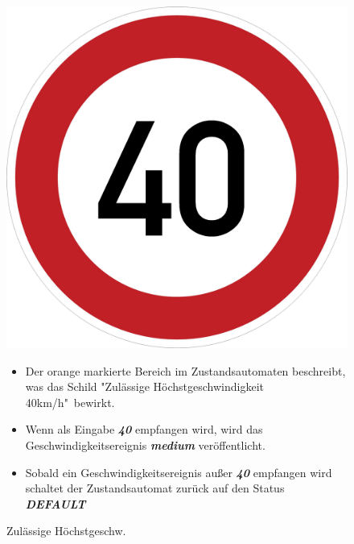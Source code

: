 \begin{figure}[h]
\begin{minipage}[t]{4cm}
\vspace{0pt}
\centering
\includegraphics[scale=0.07]{images/40.png}
\caption{Zul\"assige H\"ochstgeschw.}
\label{fig:PED}
\end{minipage}
\hfill
\begin{minipage}[t]{10cm}
\vspace{0pt}
\begin{itemize}
\item Der orange markierte Bereich im Zustandsautomaten beschreibt, was das Schild "Zul\"assige H\"ochstgeschwindigkeit 40km/h"\ bewirkt.

\item Wenn als Eingabe \textbf{\textit{40}} empfangen wird, wird das Geschwindigkeitsereignis \textbf{\textit{medium}} ver\"offentlicht.

\item Sobald ein Geschwindigkeitsereignis au\ss{}er \textbf{\textit{40}} empfangen wird schaltet der Zustandsautomat zur\"uck auf den Status \textbf{\textit{DEFAULT}}
\end{itemize}
\end{minipage}
\end{figure}


